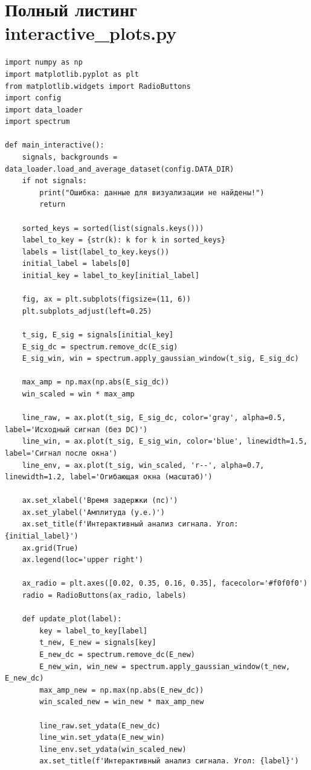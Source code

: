 \section{Полный листинг interactive\_plots.py} \label{app:interactive_plots}
\begin{verbatim}
import numpy as np
import matplotlib.pyplot as plt
from matplotlib.widgets import RadioButtons
import config
import data_loader
import spectrum

def main_interactive():
    signals, backgrounds = data_loader.load_and_average_dataset(config.DATA_DIR)
    if not signals:
        print("Ошибка: данные для визуализации не найдены!")
        return

    sorted_keys = sorted(list(signals.keys()))
    label_to_key = {str(k): k for k in sorted_keys}
    labels = list(label_to_key.keys())
    initial_label = labels[0]
    initial_key = label_to_key[initial_label]

    fig, ax = plt.subplots(figsize=(11, 6))
    plt.subplots_adjust(left=0.25)

    t_sig, E_sig = signals[initial_key]
    E_sig_dc = spectrum.remove_dc(E_sig)
    E_sig_win, win = spectrum.apply_gaussian_window(t_sig, E_sig_dc)

    max_amp = np.max(np.abs(E_sig_dc))
    win_scaled = win * max_amp

    line_raw, = ax.plot(t_sig, E_sig_dc, color='gray', alpha=0.5, label='Исходный сигнал (без DC)')
    line_win, = ax.plot(t_sig, E_sig_win, color='blue', linewidth=1.5, label='Сигнал после окна')
    line_env, = ax.plot(t_sig, win_scaled, 'r--', alpha=0.7, linewidth=1.2, label='Огибающая окна (масштаб)')
    
    ax.set_xlabel('Время задержки (пс)')
    ax.set_ylabel('Амплитуда (у.е.)')
    ax.set_title(f'Интерактивный анализ сигнала. Угол: {initial_label}')
    ax.grid(True)
    ax.legend(loc='upper right')

    ax_radio = plt.axes([0.02, 0.35, 0.16, 0.35], facecolor='#f0f0f0')
    radio = RadioButtons(ax_radio, labels)

    def update_plot(label):
        key = label_to_key[label]
        t_new, E_new = signals[key]
        E_new_dc = spectrum.remove_dc(E_new)
        E_new_win, win_new = spectrum.apply_gaussian_window(t_new, E_new_dc)
        max_amp_new = np.max(np.abs(E_new_dc))
        win_scaled_new = win_new * max_amp_new

        line_raw.set_ydata(E_new_dc)
        line_win.set_ydata(E_new_win)
        line_env.set_ydata(win_scaled_new)
        ax.set_title(f'Интерактивный анализ сигнала. Угол: {label}')
        

\end{verbatim}
